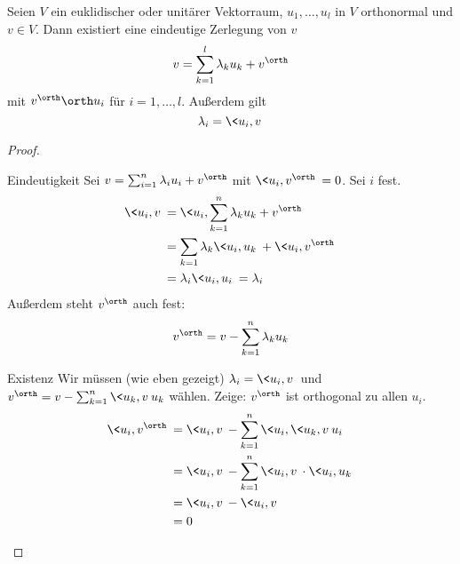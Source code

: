 \documentclass{mycourse}
\begin{document}
\begin{prop}
	\label{prop:13.9}
	Seien $V$ ein euklidischer oder unitärer Vektorraum, $u_1,\dotsc, u_l$ in $V$ orthonormal und $v\in V$.
	Dann existiert eine eindeutige Zerlegung von $v$
	\[
		v = \sum_{k=1}^l \lambda_ku_k + v^\orth
	\]
	mit $v^\orth \orth u_i$ für $i=1,\dotsc, l$.
	Außerdem gilt
	\[
		\lambda_i = \<u_i, v\>
	\]
	\begin{proof}
		\begin{seg}{Eindeutigkeit}
			Sei $v=\sum_{i=1}^n\lambda_iu_i + v^\orth$ mit $\<u_i,v^\orth\>=0$.
			Sei $i$ fest.
			\begin{align*}
				\<u_i,v\> &= \<u_i,\sum_{k=1}^n\lambda_k u_k + v^\orth\>\\
						  &=\sum_{k=1}\lambda_k\<u_i,u_k\> +\<u_i,v^\orth\>\\
						  &=\lambda_i\<u_i,u_i\> = \lambda_i
			\end{align*}
			Außerdem steht $v^\orth$ auch fest:
			\[
				v^\orth = v - \sum_{k=1}^n\lambda_ku_k
			\]
		\end{seg}
		\begin{seg}{Existenz}
			Wir müssen (wie eben gezeigt) $\lambda_i=\<u_i,v\>$ und $v^\orth = v-\sum_{k=1}^n\<u_k,v\>u_k$ wählen.
			Zeige: $v^\orth$ ist orthogonal zu allen $u_i$.
			\begin{align*}
				\<u_i,v^\orth\> &= \<u_i,v\> -\sum_{k=1}^n \<u_i,\<u_k,v\>u_i\>\\
								&=\<u_i,v\> -\sum_{k=1}^n \<u_i,v\>\cdot\<u_i,u_k\>\\
					&=\<u_i,v\> - \<u_i,v\>\\
				 &=0
			\end{align*}
		\end{seg}
	\end{proof}
\end{prop}
\end{document}
